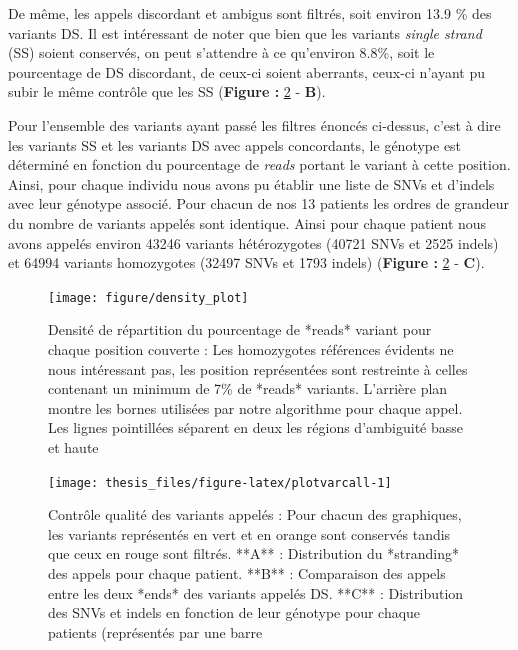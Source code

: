 \documentclass[12pt,twoside]{reedthesis}
\theoremstyle{definition}
\theoremstyle{definition}
\theoremstyle{remark}
\begin{document}
  De même, les appels discordant et ambigus sont filtrés, soit environ
  13.9 \% des variants DS. Il est intéressant de noter que bien que les
  variants \emph{single strand} (SS) soient conservés, on peut s'attendre
  à ce qu'environ 8.8\%, soit le pourcentage de DS discordant, de ceux-ci
  soient aberrants, ceux-ci n'ayant pu subir le même contrôle que les SS
  (\textbf{Figure : }\ref{fig:plotvarcall} - \textbf{B}).
  
  Pour l'ensemble des variants ayant passé les filtres énoncés ci-dessus,
  c'est à dire les variants SS et les variants DS avec appels concordants,
  le génotype est déterminé en fonction du pourcentage de \emph{reads}
  portant le variant à cette position. Ainsi, pour chaque individu nous
  avons pu établir une liste de SNVs et d'indels avec leur génotype
  associé. Pour chacun de nos 13 patients les ordres de grandeur du nombre
  de variants appelés sont identique. Ainsi pour chaque patient nous avons
  appelés environ 43246 variants hétérozygotes (40721 SNVs et 2525 indels)
  et 64994 variants homozygotes (32497 SNVs et 1793 indels)
  (\textbf{Figure : }\ref{fig:plotvarcall} - \textbf{C}).
  
  \newpage
  
  \begin{figure}
  
  {\centering \texttt{[image: figure/density\_plot]} 
  
  }
  
  \caption[Densité de répartition du pourcentage de *reads* variant pour chaque position couverte]{Densité de répartition du pourcentage de *reads* variant pour chaque position couverte : Les homozygotes références évidents ne nous intéressant pas, les position représentées sont restreinte à celles contenant un minimum de 7\% de *reads* variants. L'arrière plan montre les bornes utilisées par notre algorithme pour chaque appel. Les lignes pointillées séparent en deux les régions d'ambiguité basse et haute}\label{fig:plotdensityvar}
  \end{figure}
  
  \newpage
  
  \begin{figure}
  
  {\centering \texttt{[image: thesis\_files/figure-latex/plotvarcall-1]} 
  
  }
  
  \caption[Contrôle qualité des variants appelés]{Contrôle qualité des variants appelés : Pour chacun des graphiques, les variants représentés en vert et en orange sont conservés tandis que ceux en rouge sont filtrés. **A** : Distribution du *stranding* des appels pour chaque patient. **B** : Comparaison des appels entre les deux *ends* des variants appelés DS. **C** : Distribution des SNVs et indels en fonction de leur génotype pour chaque patients (représentés par une barre}\label{fig:plotvarcall}
  \end{figure}
  
\end{document}
